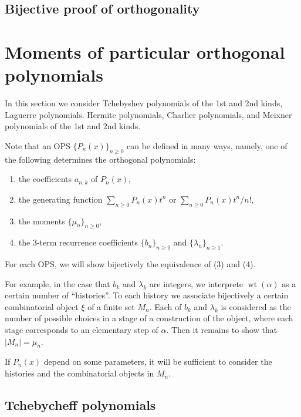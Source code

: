 \documentclass{amsart}
\numberwithin{equation}{section}
\theoremstyle{definition}
\newcommand\wt{\operatorname{wt}}
\begin{document}
\subsection{Bijective proof of orthogonality}

\section{Moments of particular orthogonal polynomials}

In this section we consider
Tchebyshev polynomials of the 1st and 2nd kinds,
Laguerre polynomials. Hermite polynomials,
Charlier polynomials, and Meixner polynomials of the 1st and 2nd kinds.

Note that an OPS \( \{ P_n(x) \}_{n\ge 0} \) can be defined in many
ways, namely, one of the following determines the orthogonal
polynomials:
\begin{enumerate}
\item the coefficients \( a_{n,k} \) of \( P_n(x) \),
\item the generating function \( \sum_{n\ge0}P_n(x)t^n \)
  or \( \sum_{n\ge0}P_n(x)t^n/n! \),
\item the moments \( \{ \mu_n\}_{n\ge 0} \),
\item the 3-term recurrence coefficients \( \{ b_n\}_{n\ge 0} \) and
  \( \{ \lambda_n\}_{n\ge 1} \).
\end{enumerate}

For each OPS, we will show bijectively the equivalence of (3) and (4).

For example, in the case that \( b_k \) and \( \lambda_k \) are
integers, we interprete \( \wt(\alpha) \) as a certain number of
``histories''. To each history we associate bijectively a certain
combinatorial object \( \xi \) of a finite set \( M_n \). Each of
\( b_k \) and \( \lambda_k \) is considered as the number of possible
choices in a stage of a construction of the object, where each stage
corresponds to an elementary step of \( \alpha \). Then it remains to
show that \( |M_n| = \mu_n \).

If \( P_n(x) \) depend on some parameters, it will be sufficient to
consider the histories and the combinatorial objects in \( M_n \).

\subsection{Tchebycheff polynomials}

\end{document}

